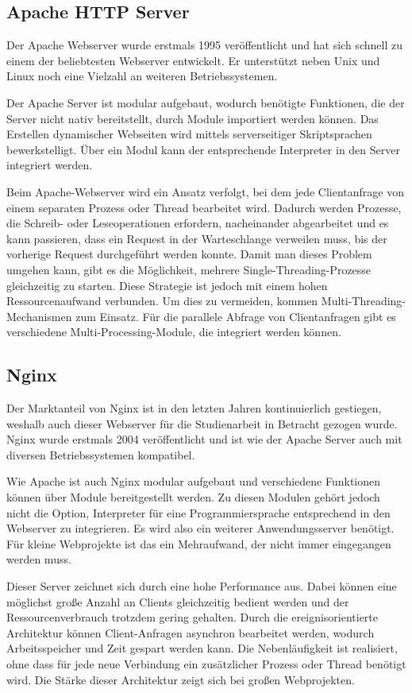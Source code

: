 \subsection{Apache HTTP Server}
Der Apache Webserver wurde erstmals 1995 veröffentlicht und hat sich schnell zu einem der beliebtesten Webserver entwickelt. Er unterstützt neben Unix und Linux noch eine Vielzahl an weiteren Betriebssystemen.

Der Apache Server ist modular aufgebaut, wodurch benötigte Funktionen, die der Server nicht nativ bereitstellt, durch Module importiert werden können. Das Erstellen dynamischer Webseiten wird mittels serverseitiger Skriptsprachen bewerkstelligt. Über ein Modul kann der entsprechende Interpreter in den Server integriert werden.

Beim Apache-Webserver wird ein Ansatz verfolgt, bei dem jede Clientanfrage von einem separaten Prozess oder Thread bearbeitet wird. Dadurch werden Prozesse, die Schreib- oder Leseoperationen erfordern, nacheinander abgearbeitet und es kann passieren, dass ein Request in der Warteschlange verweilen muss, bis der vorherige Request durchgeführt werden konnte. Damit man dieses Problem umgehen kann, gibt es die Möglichkeit, mehrere Single-Threading-Prozesse gleichzeitig zu starten. Diese Strategie ist jedoch mit einem hohen Ressourcenaufwand verbunden. Um dies zu vermeiden, kommen Multi-Threading-Mechanismen zum Einsatz. Für die parallele Abfrage von Clientanfragen gibt es verschiedene Multi-Processing-Module, die integriert werden können. \cite{karlstetter_2019} \cite{ionosdigitalguide_2017}


\subsection{Nginx}
Der Marktanteil von Nginx ist in den letzten Jahren kontinuierlich gestiegen, weshalb auch dieser Webserver für die Studienarbeit in Betracht gezogen wurde. Nginx wurde erstmals 2004 veröffentlicht und ist wie der Apache Server auch mit diversen Betriebssystemen kompatibel.

Wie Apache ist auch Nginx modular aufgebaut und verschiedene Funktionen können über Module bereitgestellt werden. Zu diesen Modulen gehört jedoch nicht die Option, Interpreter für eine Programmiersprache entsprechend in den Webserver zu integrieren. Es wird also ein weiterer Anwendungsserver benötigt. Für kleine Webprojekte ist das ein Mehraufwand, der nicht immer eingegangen werden muss. 

Dieser Server zeichnet sich durch eine hohe Performance aus. Dabei können eine möglichst große Anzahl an Clients gleichzeitig bedient werden und der Ressourcenverbrauch trotzdem gering gehalten. Durch die ereignisorientierte Architektur können Client-Anfragen asynchron bearbeitet werden, wodurch Arbeitsspeicher und Zeit gespart werden kann. Die Nebenläufigkeit ist realisiert, ohne dass für jede neue Verbindung ein zusätzlicher Prozess oder Thread benötigt wird. Die Stärke dieser Architektur zeigt sich bei großen Webprojekten. \cite{karlstetter_2019} \cite{ionosdigitalguide_2017}


